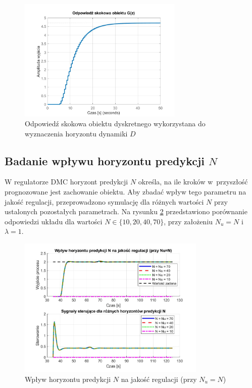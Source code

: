 \documentclass[a4paper,titlepage,11pt,floatssmall]{mwrep}
\begin{document}
\begin{figure}[H]
    \centering
    \includegraphics[width=0.7\textwidth]{kod/wykresy/step.jpg}
    \caption{Odpowiedź skokowa obiektu dyskretnego wykorzystana do wyznaczenia horyzontu dynamiki $D$}
    \label{fig:step}
\end{figure}

\subsection{Badanie wpływu horyzontu predykcji $N$}

W regulatorze DMC horyzont predykcji $N$ określa, na ile kroków w~przyszłość prognozowane jest zachowanie obiektu. Aby zbadać wpływ tego parametru na jakość regulacji, przeprowadzono symulację dla różnych wartości $N$ przy ustalonych pozostałych parametrach. Na rysunku \ref{fig:N_comparison} przedstawiono porównanie odpowiedzi układu dla wartości $N \in \{10, 20, 40, 70\}$, przy założeniu $N_u = N$ i~$\lambda = 1$.

\begin{figure}[H]
    \centering
    \includegraphics[width=0.8\textwidth]{kod/wykresy/horyzont_predykcji_porownanie.jpg}
    \caption{Wpływ horyzontu predykcji $N$ na jakość regulacji (przy $N_u = N$)}
    \label{fig:N_comparison}
\end{figure}
\end{document}
